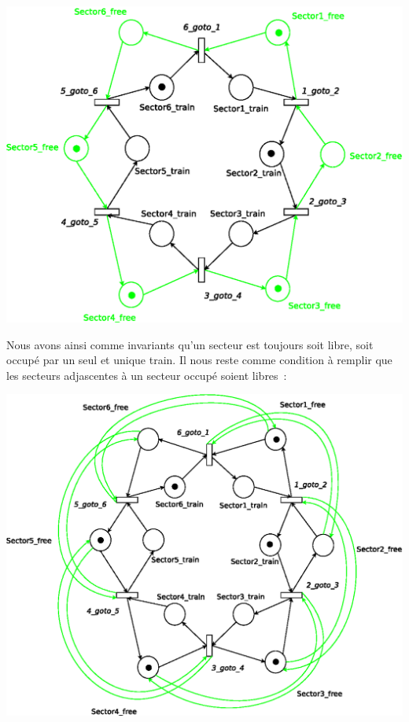\begin{center}
\includegraphics[height = 0.4\paperwidth]{exo8_2.eps}
\end{center}

Nous avons ainsi comme invariants qu'un secteur est toujours soit libre, soit
occupé par un seul et unique train. Il nous reste comme condition à remplir que
les secteurs adjascentes à un secteur occupé soient libres~:

\begin{center}
\includegraphics[height = 0.5\paperwidth]{exo8_3.eps}
\end{center}

